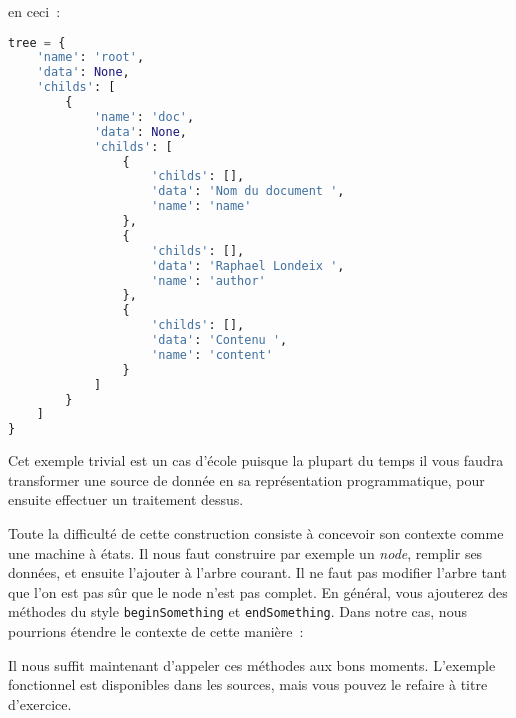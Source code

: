 \documentclass[a4paper]{article}
\newcommand{\fixed}[1]{\texttt{#1}}
\begin{document}
            en ceci~:

\lstset{caption=Arbre de dictionnaire}
\begin{lstlisting}[language=python]
tree = {
    'name': 'root',
    'data': None,
    'childs': [
        {
            'name': 'doc',
            'data': None,
            'childs': [
                {
                    'childs': [],
                    'data': 'Nom du document ',
                    'name': 'name'
                },
                {
                    'childs': [],
                    'data': 'Raphael Londeix ',
                    'name': 'author'
                },
                {
                    'childs': [],
                    'data': 'Contenu ',
                    'name': 'content'
                }
            ]
        }
    ]
}
\end{lstlisting}
            Cet exemple trivial est un cas d'école puisque la plupart du temps
            il vous faudra transformer une source de donnée en sa représentation
            programmatique, pour ensuite effectuer un traitement dessus.

            Toute la difficulté de cette construction consiste à concevoir
            son contexte comme une machine à états. Il nous faut construire
            par exemple un \emph{node}, remplir ses données, et ensuite l'ajouter
            à l'arbre courant. Il ne faut pas modifier l'arbre tant que l'on est
            pas sûr que le node n'est pas complet. En général, vous ajouterez des
            méthodes du style \fixed{beginSomething} et \fixed{endSomething}.
            Dans notre cas, nous pourrions étendre le contexte de cette manière~:

            Il nous suffit maintenant d'appeler ces méthodes aux bons moments.
            L'exemple fonctionnel est disponibles dans les sources, mais
            vous pouvez le refaire à titre d'exercice.
\end{document}
